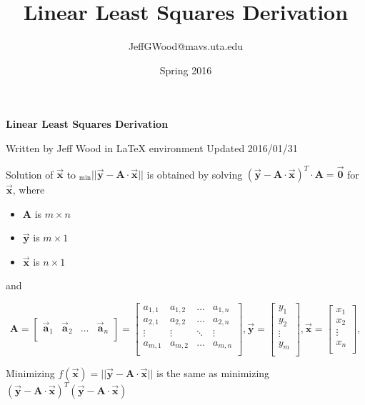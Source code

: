 \documentclass[a4paper,10pt]{article}
\title{Linear Least Squares Derivation}
\author{JeffGWood@mavs.uta.edu}
\date{Spring 2016}
\newcommand{\cA}{\ensuremath{\mathbf{A}}}
\newcommand{\cx}{\ensuremath{\vec{\mathbf{x}}}}
\newcommand{\cy}{\ensuremath{\vec{\mathbf{y}}}}
\newcommand{\cZero}{\ensuremath{\vec{\mathbf{0}}}}
\newcommand{\vLength}[1]{\ensuremath{\lvert\lvert{#1}\lvert\lvert}}
\newcommand{\cAij}[2]{\ensuremath{a_{{#1},{#2}}}}
\newcommand{\caj}[1]{\ensuremath{\vec{\mathbf{a}}_{#1}}}
\newcommand{\cxj}[1]{\ensuremath{x_{#1}}}
\newcommand{\cyi}[1]{\ensuremath{y_{#1}}}
\begin{document}
\Huge\center\textbf{Linear Least Squares Derivation}\newline

\large Written by Jeff Wood in LaTeX environment\newline
\large Updated 2016/01/31 \newline
\normalsize

\flushleft
Solution of $\cx$ to $_{\min}\vLength{\cy - \cA\cdot\cx}$ is obtained by solving $\left(\cy - \cA\cdot\cx\right)^{T}\cdot{\cA} = \cZero$ for $\cx$, where

\begin{itemize}
\item $\cA$ is $m \times n$
\item $\cy$ is $m \times 1$
\item $\cx$ is $n \times 1$ 
\end{itemize}

and




\begin{equation}
\cA = 
\begin{bmatrix}
\caj{1} & \caj{2} & \hdots & \caj{n}\\ 
\end{bmatrix}
=
\begin{bmatrix}
\cAij{1}{1} & \cAij{1}{2} & \hdots & \cAij{1}{n} \\ 
\cAij{2}{1} & \cAij{2}{2} & \hdots & \cAij{2}{n} \\ 
\vdots & \vdots & \ddots & \vdots \\
\cAij{m}{1} & \cAij{m}{2} & \hdots & \cAij{m}{n} \\ 
\end{bmatrix},
\cy = 
\begin{bmatrix}
\cyi{1}\\ 
\cyi{2}\\ 
\vdots\\
\cyi{m}\\ 
\end{bmatrix},
\cx = 
\begin{bmatrix}
\cxj{1}\\ 
\cxj{2}\\ 
\vdots\\
\cxj{n}\\ 
\end{bmatrix},
\end{equation}


Minimizing $f\left(\cx\right)=\vLength{\cy - \cA\cdot\cx}$ is the same as minimizing $\left(\cy - \cA\cdot\cx\right)^{T}\left(\cy - \cA\cdot\cx\right)$
\end{document}
